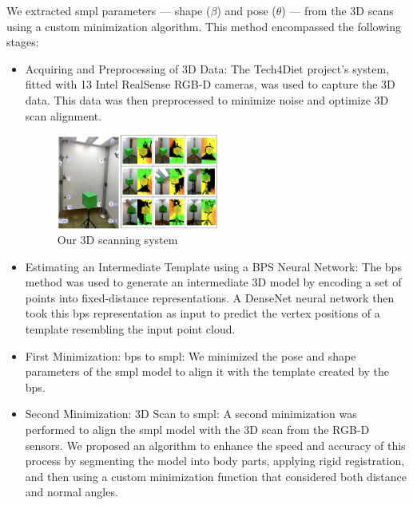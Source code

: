 We extracted \gls{smpl} parameters — shape ($\beta$) and pose ($\theta$) — from
the 3D scans using a custom minimization algorithm. This method encompassed the
following stages:

\begin{itemize}
    \item Acquiring and Preprocessing of 3D Data: The Tech4Diet project's system, fitted
          with 13 Intel RealSense RGB-D cameras, was used to capture the 3D data. This
          data was then preprocessed to minimize noise and optimize 3D scan alignment.

          \begin{figure}[H]
              \centering
              \includegraphics[width=0.5\textwidth]{files/cameras_scan.png}
              \caption{Our 3D scanning system}
          \end{figure}

    \item Estimating an Intermediate Template using a BPS Neural Network: The \gls{bps}
          method was used to generate an intermediate 3D model by encoding a set of
          points into fixed-distance representations. A DenseNet neural network then took
          this \gls{bps} representation as input to predict the vertex positions of a
          template resembling the input point cloud.

    \item First Minimization: \gls{bps} to \gls{smpl}: We minimized the pose and shape
          parameters of the \gls{smpl} model to align it with the template created by the
          \gls{bps}.

    \item Second Minimization: 3D Scan to \gls{smpl}: A second minimization was performed
          to align the \gls{smpl} model with the 3D scan from the RGB-D sensors. We
          proposed an algorithm to enhance the speed and accuracy of this process by
          segmenting the model into body parts, applying rigid registration, and then
          using a custom minimization function that considered both distance and normal
          angles.
\end{itemize}

